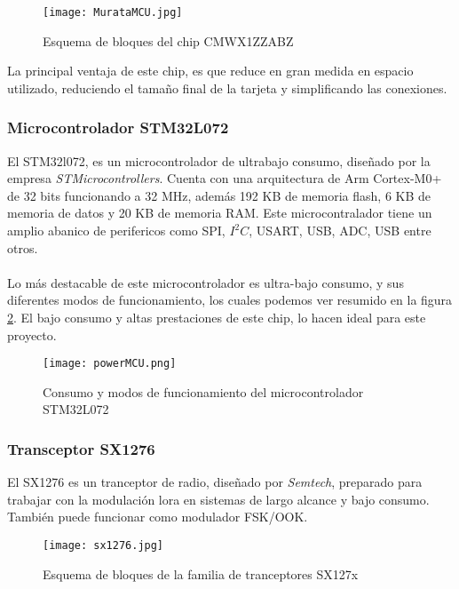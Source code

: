 	
	\begin{figure}[hbt!]
		\centering
		\texttt{[image: MurataMCU.jpg]}
		\caption{Esquema de bloques del chip CMWX1ZZABZ}
		\label{fig:CMWX1ZZABZ}
	\end{figure}
	
	La principal ventaja de este chip, es que reduce en gran medida en espacio utilizado, reduciendo el tamaño final de la tarjeta  y simplificando las conexiones.
	\subsubsection{Microcontrolador STM32L072}
	
	El STM32l072, es un microcontrolador de ultrabajo consumo, diseñado por la empresa \textit{STMicrocontrollers}. Cuenta con una arquitectura de Arm Cortex-M0+ de 32 bits funcionando a 32 MHz, además 192 KB de memoria flash, 6 KB de memoria de datos y 20 KB de memoria RAM. Este microcontralador tiene un amplio abanico de perifericos como SPI, $I^2C$, USART, USB, ADC, USB entre otros. 
	\paragraph{}	
	Lo más destacable de este microcontrolador es ultra-bajo consumo, y sus diferentes modos de funcionamiento, los cuales podemos ver resumido en la figura \ref{fig::powerMCU}. El bajo consumo y altas prestaciones de este chip, lo hacen ideal para este proyecto.
	
	\begin{figure}[hbt!]
		\centering
		\texttt{[image: powerMCU.png]}
		\caption{Consumo y modos de funcionamiento del microcontrolador STM32L072}
		\label{fig::powerMCU}
	\end{figure}
	
	\subsubsection{Transceptor SX1276}
	
	El SX1276 es un tranceptor de radio, diseñado por \textit{Semtech}, preparado para trabajar con la modulación lora en sistemas de largo alcance y bajo consumo. También puede funcionar como modulador FSK/OOK.
	
	\begin{figure}[hbt!]
		\centering
		\texttt{[image: sx1276.jpg]}
		\caption{Esquema de bloques de la familia de tranceptores SX127x}
	\end{figure}
	
